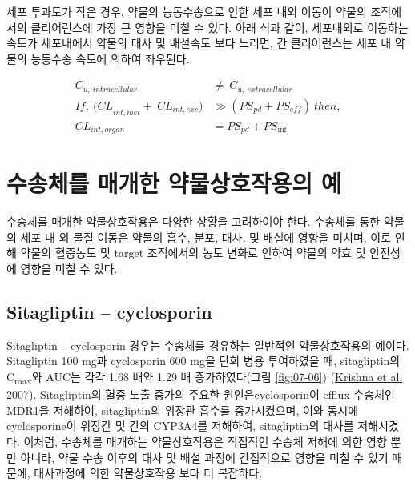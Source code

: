 \documentclass[
  11pt,
  krantz2, a4paper, twoside]{krantz}
\begin{document}
세포 투과도가 작은 경우, 약물의 능동수송으로 인한 세포 내외 이동이
약물의 조직에서의 클리어런스에 가장 큰 영향을 미칠 수 있다. 아래 식과
같이, 세포내외로 이동하는 속도가 세포내에서 약물의 대사 및 배설속도
보다 느리면, 간 클리어런스는 세포 내 약물의 능동수송 속도에 의하여
좌우된다.

\begin{equation}
\begin{split}
C_{u,\ intracellular} &\neq \ C_{u,\ extracellular} \\
{If,\ (CL}_{int,met} + \ {CL}_{int,exc}) &\gg \left( {PS}_{pd} + {PS}_{eff} \right)\ then, \\
{CL}_{int,organ} &= {PS}_{pd} + {PS}_{\inf}
\end{split}
\label{eq:eq07-02} 
\end{equation}

\hypertarget{uxc218uxc1a1uxccb4uxb97c-uxb9e4uxac1cuxd55c-uxc57duxbb3cuxc0c1uxd638uxc791uxc6a9uxc758-uxc608}{%
\section{수송체를 매개한 약물상호작용의 예}\label{uxc218uxc1a1uxccb4uxb97c-uxb9e4uxac1cuxd55c-uxc57duxbb3cuxc0c1uxd638uxc791uxc6a9uxc758-uxc608}}

수송체를 매개한 약물상호작용은 다양한 상황을 고려하여야 한다. 수송체를
통한 약물의 세포 내 외 물질 이동은 약물의 흡수, 분포, 대사, 및 배설에
영향을 미치며, 이로 인해 약물의 혈중농도 및 target 조직에서의 농도
변화로 인하여 약물의 약효 및 안전성에 영향을 미칠 수 있다.

\hypertarget{sitagliptin-cyclosporin}{%
\subsection{Sitagliptin -- cyclosporin}\label{sitagliptin-cyclosporin}}

Sitagliptin -- cyclosporin 경우는 수송체를 경유하는 일반적인
약물상호작용의 예이다. Sitagliptin 100 mg과 cyclosporin 600 mg을 단회
병용 투여하였을 때, sitagliptin의 C\textsubscript{max}와 AUC는 각각 1.68 배와 1.29 배
증가하였다(그림 \ref{fig:07-06}) (\protect\hyperlink{ref-krishna2007effect}{Krishna et al. 2007}). Sitagliptin의 혈중 노출
증가의 주요한 원인은cyclosporin이 efflux 수송체인 MDR1을 저해하여,
sitagliptin의 위장관 흡수를 증가시켰으며, 이와 동시에 cyclosporine이
위장간 및 간의 CYP3A4를 저해하여, sitagliptin의 대사를 저해시켰다.
이처럼, 수송체를 매개하는 약물상호작용은 직접적인 수송체 저해에 의한
영향 뿐만 아니라, 약물 수송 이후의 대사 및 배설 과정에 간접적으로 영향을
미칠 수 있기 때문에, 대사과정에 의한 약물상호작용 보다 더 복잡하다.
\end{document}
